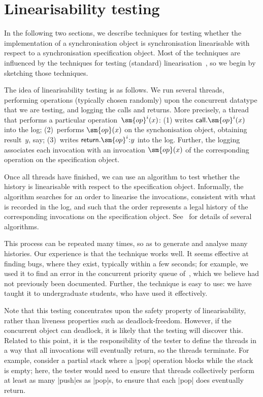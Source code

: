 \section{Linearisability testing}
\label{sec:lin-testing}

In the following two sections, we describe techniques for testing whether the
implementation of a synchronisation object is synchronisation linearisable
with respect to a synchronisation specification object.
%
Most of the techniques are influenced by the techniques for testing (standard)
linearisation~\cite{gavin:lin-testing}, so we begin by sketching those
techniques.

The idea of linearisability testing is as follows.  We run several threads,
performing operations (typically chosen randomly) upon the concurrent datatype
that we are testing, and logging the calls and returns.  More precisely, a
thread that performs a particular operation~$\sm{op}^i(x)$: (1) writes
$\call.\sm{op}^i(x)$ into the log; (2)~performs $\sm{op}(x)$ on the
synchonisation object, obtaining result~$y$, say; (3)~writes
$\return.\sm{op}^i \:: y$ into the log.  Further, the logging associates each
invocation with an invocation $\sm{op}(x)$ of the corresponding operation
on the specification object.

Once all threads have finished, we can use an algorithm to test whether the
history is linearisable with respect to the specification object.  Informally,
the algorithm searches for an order to linearise the invocations, consistent
with what is recorded in the log, and such that the order represents a legal
history of the corresponding invocations on the specification object.
See~\cite{gavin:lin-testing} for details of several algorithms.

This process can be repeated many times, so as to generate and analyse many
histories.  Our experience is that the technique works well.  It seems
effective at finding bugs, where they exist, typically within a few seconds;
for example, we used it to find an error in the concurrent priority queue
of~\cite{faulty-pri-queue}, which we believe had not previously been
documented.  Further, the technique is easy to use: we have taught it to
undergraduate students, who have used it effectively.

Note that this testing concentrates upon the safety property of linearisability,
rather than liveness properties such as deadlock-freedom.  However, if the
concurrent object can deadlock, it is likely that the testing will discover
this.  Related to this point, it is the responsibility of the tester to define
the threads in a way that all invocations will eventually return, so the
threads terminate.  For example, consider a partial stack where a |pop|
operation blocks while the stack is empty; here, the tester would need to
ensure that threads collectively perform at least as many |push|es as |pop|s,
to ensure that each |pop| does eventually return.

